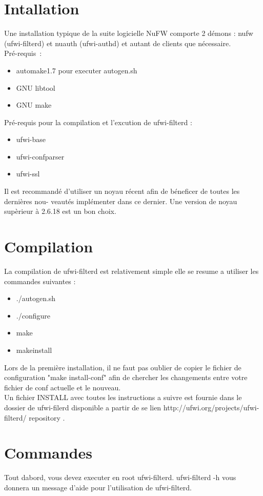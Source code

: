 \documentclass[12pt]{report}
\begin{document}
\section{Intallation}
Une installation typique de la suite logicielle NuFW comporte 2 démons : nufw (ufwi-filterd) et nuauth (ufwi-authd) et autant de clients que nécessaire.\\
Pré-requis :
\begin{itemize}
  \item automake1.7 pour executer autogen.sh
  \item GNU libtool
  \item GNU make
\end{itemize}
Pré-requis pour la compilation et l'excution de ufwi-filterd :
\begin{itemize}
  \item ufwi-base
  \item ufwi-confparser
  \item ufwi-ssl
\end{itemize}
Il est recommandé d'utiliser un noyau récent afin de béneficer de toutes les dernières nou-
veautés implémenter dans ce dernier. Une version de noyau supèrieur à 2.6.18 est un bon choix.
\newpage
\section{Compilation}
La compilation de ufwi-filterd est relativement simple elle se resume a utiliser les commandes suivantes :
\begin{itemize}
  \item ./autogen.sh
  \item ./configure
  \item make
  \item makeinstall
\end{itemize}
Lors de la première installation, il ne faut pas oublier de copier le fichier de configuration "make install-conf" afin de chercher les changements entre votre fichier de conf actuelle et le nouveau.\\
Un fichier INSTALL avec toutes les instructions a suivre est fournie dans le dossier de ufwi-filerd disponible a partir de se lien http://ufwi.org/projects/ufwi-filterd/ repository .
\section{Commandes}
Tout dabord, vous devez executer en root ufwi-filterd.
ufwi-filterd -h vous donnera un message d'aide pour l'utilisation de ufwi-filterd.
\end{document}
